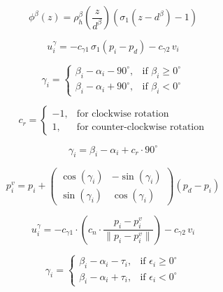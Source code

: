 \documentclass[conference]{IEEEtran}
\begin{document}
\begin{equation}
\phi^{\beta}(z) = \rho^{\beta}_h \left( \frac{z}{d^{\beta}} \right) \left( \sigma_1(z - d^{\beta}) - 1 \right)
\label{eq:24}
\end{equation}

\begin{equation}
u^{\gamma}_i = -c_{\gamma 1} \, \sigma_1(p_i - p_d) - c_{\gamma 2} \, v_i
\label{eq:25}
\end{equation}

\begin{equation}
\gamma_i =
\begin{cases}
\beta_i - \alpha_i - 90^\circ, & \text{if } \beta_i \geq 0^\circ \\
\beta_i - \alpha_i + 90^\circ, & \text{if } \beta_i < 0^\circ
\end{cases}
\label{eq:26}
\end{equation}

\begin{equation}
c_r =
\begin{cases}
-1, & \text{for clockwise rotation} \\
1,  & \text{for counter-clockwise rotation}
\end{cases}
\label{eq:27}
\end{equation}

\begin{equation}
\gamma_i = \beta_i - \alpha_i + c_r \cdot 90^\circ
\label{eq:28}
\end{equation}

\begin{equation}
p^{v}_i = p_i +
\begin{pmatrix}
\cos(\gamma_i) & -\sin(\gamma_i) \\
\sin(\gamma_i) & \cos(\gamma_i)
\end{pmatrix}
(p_d - p_i)
\label{eq:29}
\end{equation}

\begin{equation}
u^{\gamma}_i = -c_{\gamma 1} \cdot \left( c_n \cdot \frac{p_i - p^v_i}{\| p_i - p^v_i \|} \right) - c_{\gamma 2} \, v_i
\label{eq:30}
\end{equation}

\begin{equation}
\gamma_i =
\begin{cases}
\beta_i - \alpha_i - \tau_i, & \text{if } \epsilon_i \geq 0^\circ \\
\beta_i - \alpha_i + \tau_i, & \text{if } \epsilon_i < 0^\circ
\end{cases}
\label{eq:31}
\end{equation}
\end{document}
